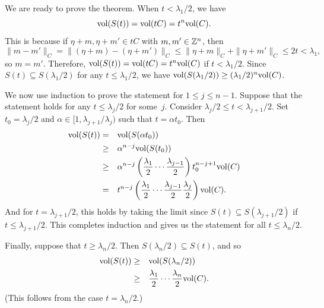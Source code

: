 \documentclass{Vorlesungstemplate_English} %
\begin{document}
\begin{pf}
    We are ready to prove the theorem.
    When \(t < \lambda_1 / 2\), we have
    \begin{equation*}
        \text{vol}(S(t))
        = \text{vol}(tC)
        = t^n \text{vol}(C).
    \end{equation*}
    This is because if \(\eta + m, \eta + m' \in tC\) with \(m, m' \in \mathbb{Z}^n\), then
    \begin{equation*}
        \|m - m'\|_C
        = \|(\eta + m) - (\eta + m')\|_C
        \le \|\eta + m\|_C + \|\eta + m'\|_C
        \le 2t
        < \lambda_1,
    \end{equation*}
    so \(m = m'\).
    Therefore, \(\text{vol}(S(t)) = \text{vol}(tC) = t^n \text{vol}(C)\) if \(t < \lambda_1 / 2\).
    Since \(S(t) \subseteq S(\lambda_1 / 2)\) for any \(t \le \lambda_1 / 2\), we have \(\text{vol}(S(\lambda_1 / 2)) \ge (\lambda_1 / 2)^n \text{vol}(C)\).

    We now use induction to prove the statement for \(1 \le j \le n-1\).
    Suppose that the statement holds for any \(t \le \lambda_j / 2\) for some~\(j\).
    Consider \(\lambda_j / 2 \le t < \lambda_{j+1} / 2\).
    Set \(t_0 = \lambda_j / 2\) and \(\alpha \in [1, \lambda_{j+1} / \lambda_j)\) such that \(t = \alpha t_0\).
    Then
    \begin{align*}
        \text{vol}(S(t))
        = \quad & \text{vol}(S(\alpha t_0)) \\
        \ge \quad & \alpha^{n-j} \text{vol}(S(t_0)) \\
        \ge \quad & \alpha^{n-j} \left(\frac{\lambda_1}{2} \dotsm \frac{\lambda_{j-1}}{2}\right) t_0^{n-j+1} \text{vol}(C) \\
        = \quad & t^{n-j} \left(\frac{\lambda_1}{2} \dotsm \frac{\lambda_{j-1}}{2} \frac{\lambda_j}{2}\right) \text{vol}(C).
    \end{align*}
    And for \(t = \lambda_{j+1} / 2\), this holds by taking the limit since \(S(t) \subseteq S(\lambda_{j+1} / 2)\) if \(t \le \lambda_{j+1} / 2\).
    This completes induction and gives us the statement for all \(t \le \lambda_n / 2\).

    Finally, suppose that \(t \ge \lambda_n / 2\).
    Then \(S(\lambda_n / 2) \subseteq S(t)\), and so
    \begin{align*}
        \text{vol}(S(t))
        \ge \quad & \text{vol}(S(\lambda_n / 2)) \\
        \ge \quad & \frac{\lambda_1}{2} \dotsm \frac{\lambda_n}{2} \text{vol}(C).
    \end{align*}
    (This follows from the case \(t = \lambda_n / 2\)\@.)
\end{pf}
\end{document}
